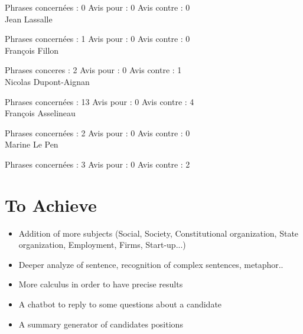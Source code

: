 \documentclass{article}
\begin{document}
Phrases concernées : 0
Avis pour : 0
Avis contre : 0
\\
Jean Lassalle

Phrases concernées : 1
Avis pour : 0
Avis contre : 0
\\
François Fillon

Phrases conceres : 2
Avis pour : 0
Avis contre : 1
\\
Nicolas Dupont-Aignan


Phrases concernées : 13
Avis pour : 0
Avis contre : 4
\\
François Asselineau


Phrases concernées : 2
Avis pour : 0
Avis contre : 0
\\
Marine Le Pen


Phrases concernées : 3
Avis pour : 0
Avis contre : 2



\section{To Achieve}
\begin{itemize}
    \item Addition of more subjects (Social, Society, Constitutional organization, State organization, Employment, Firms, Start-up...)
    \item Deeper analyze of sentence, recognition of complex sentences, metaphor..
    \item More calculus in order to have precise results
    \item A chatbot to reply to some questions about a candidate
    \item A summary generator of candidates positions
\end{itemize}
\end{document}
